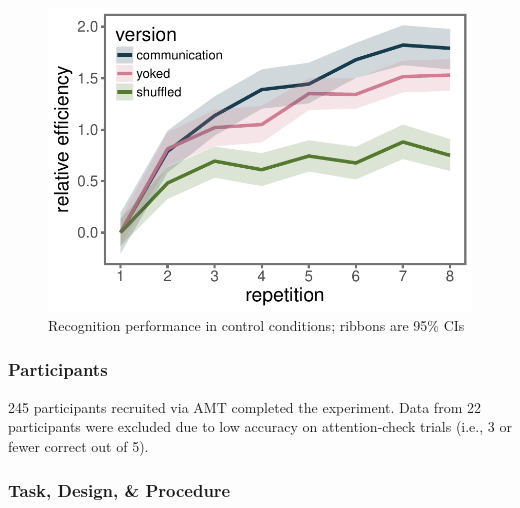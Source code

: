 \documentclass[10pt,letterpaper]{article}
\begin{document}
\begin{figure}
\includegraphics[width=\linewidth]{figures/recog_BIS_timeseries.pdf}
\caption{Recognition performance in control conditions; ribbons are 95\% CIs} 
\label{recog_bis}
\end{figure}

\subsubsection{Participants}

245 participants recruited via AMT completed the experiment. Data from 22 participants were excluded due to low accuracy on attention-check trials (i.e., 3 or fewer correct out of 5).  

\subsubsection{Task, Design, \& Procedure}

\end{document}
